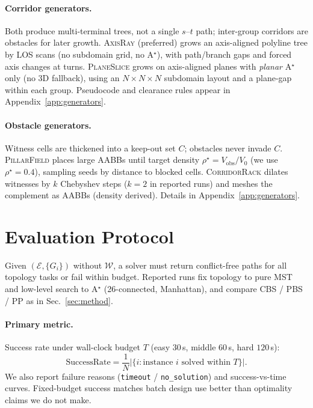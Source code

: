 \paragraph{Corridor generators.}
Both produce multi-terminal trees, not a single $s$--$t$ path; inter-group
corridors are obstacles for later growth.
\textsc{AxisRay} (preferred) grows an axis-aligned polyline tree by LOS scans
(no subdomain grid, no A$^\star$), with path/branch gaps and forced axis
changes at turns.
\textsc{PlaneSlice} grows on axis-aligned planes with \emph{planar} A$^\star$
only (no 3D fallback), using an $N{\times}N{\times}N$ subdomain layout and a
plane-gap within each group.
Pseudocode and clearance rules appear in Appendix~\ref{app:generators}.

\paragraph{Obstacle generators.}
Witness cells are thickened into a keep-out set $C$; obstacles never invade
$C$.
\textsc{PillarField} places large AABBs until target density
$\rho^\star{=}V_{\mathrm{obs}}/V_0$ (we use $\rho^\star{=}0.4$), sampling seeds
by distance to blocked cells.
\textsc{CorridorRack} dilates witnesses by $k$ Chebyshev steps
($k{=}2$ in reported runs) and meshes the complement as AABBs (density derived).
Details in Appendix~\ref{app:generators}.

\section{Evaluation Protocol}
\label{sec:eval}

Given $(\mathcal{E},\{G_i\})$ without $\mathcal{W}$, a solver must return
conflict-free paths for all topology tasks or fail within budget.
Reported runs fix topology to pure MST and low-level search to A$^\star$
(26-connected, Manhattan), and compare CBS / PBS / PP as in
Sec.~\ref{sec:method}.

\paragraph{Primary metric.}
Success rate under wall-clock budget $T$ (easy $30\,$s, middle $60\,$s, hard
$120\,$s):
\[
  \mathrm{SuccessRate}
  = \frac{1}{N}\bigl|\{ i : \text{instance $i$ solved within $T$}\}\bigr|.
\]
We also report failure reasons (\texttt{timeout} / \texttt{no\_solution}) and
success-vs-time curves. Fixed-budget success matches batch design use better
than optimality claims we do not make.

